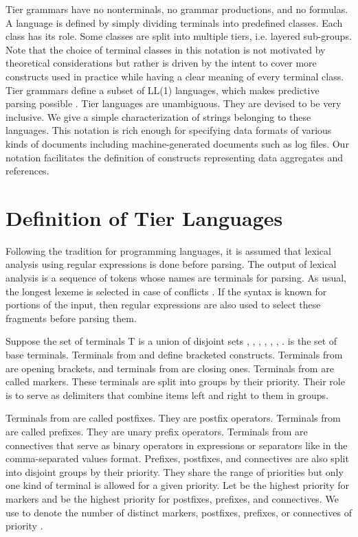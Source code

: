 \documentclass{llncs}
\begin{document}
Tier grammars have no nonterminals, no grammar productions, and no formulas. A language is defined by simply dividing terminals into predefined classes. Each class has its role. Some classes are split into multiple tiers, i.e. layered sub-groups. Note that the choice of terminal classes in this notation is not motivated by theoretical considerations but rather is driven by the intent to cover more constructs used in practice while having a clear meaning of every terminal class. Tier grammars define a subset of LL(1) languages, which makes predictive parsing possible \cite{Aho06}. Tier languages are unambiguous. They are devised to be very inclusive. We give a simple characterization of strings belonging to these languages. This notation is rich enough for specifying data formats of various kinds of documents including machine-generated documents such as log files. Our notation facilitates the definition of constructs representing data aggregates and references.  

\section{Definition of Tier Languages}

Following the tradition for programming languages, it is assumed that lexical analysis using regular expressions is done before parsing. The output of lexical analysis is a sequence of tokens whose names are terminals for parsing. As usual, the longest lexeme is selected in case of conflicts \cite{Aho06}. If the syntax is known for portions of the input, then regular expressions are also used to select these fragments before parsing them. 

Suppose the set of terminals T is a union of disjoint sets , , , , , , .  is the set of base terminals. Terminals from  and  define bracketed constructs. Terminals from  are opening brackets, and terminals from  are closing ones. Terminals from  are called markers. These terminals are split into groups by their priority. Their role is to serve as delimiters that combine items left and right to them in groups. 

Terminals from  are called postfixes. They are postfix operators. Terminals from  are called prefixes. They are unary prefix operators. Terminals from  are connectives that serve as binary operators in expressions or separators like in the comma-separated values format. Prefixes, postfixes, and connectives are also split into disjoint groups by their priority. They share the range of priorities but only one kind of terminal is allowed for a given priority. Let  be the highest priority for markers and  be the highest priority for postfixes, prefixes, and connectives. We use  to denote the number of distinct markers, postfixes, prefixes, or connectives of priority .
\end{document}

